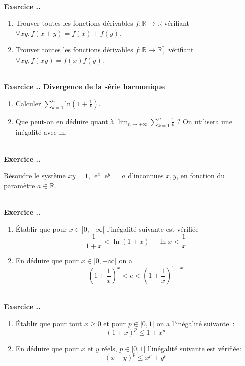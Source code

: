 \documentclass{article}
\newcommand{\ex}{{\operatorname{e}}}
\newcommand{\mb}[1]{\mathbb{#1}}
\newcounter{exo}
\newcommand{\exercice}[1][\null]{\textbf{\\ Exercice \thesection.\theexo. #1} \addtocounter{exo}{1}}
\begin{document}
\exercice

\begin{enumerate}

\item Trouver toutes les fonctions dérivables $f :\mb{R} \rightarrow \mb{R}$ vérifiant $\forall xy, f(x+y) = f(x)+ f(y)$.

\item Trouver toutes les fonctions dérivables $f :\mb{R} \rightarrow \mb{R}^*_+$ vérifiant $\forall xy, f(xy) = f(x)f(y)$.
\end{enumerate}



\exercice[Divergence de la série harmonique]

\begin{enumerate}

\item Calculer $\displaystyle \sum_{k=1}^n  \text{ln}(1+ \frac{1}{k})$.

\item Que peut-on en déduire quant à $\displaystyle \lim_{n \to + \infty} \sum_{k=1}^n \frac{1}{k}$ ? On utilisera une inégalité avec $\text{ln}$.
\end{enumerate}

\exercice

Résoudre le système $xy = 1$, ${\ex}^x {\ex}^y =a$ d'inconnues $x,y$, en fonction du paramètre $a \in \mb{R}$.


\exercice 

\begin{enumerate}
    \item Établir que pour $x \in ]0, +\infty[$ l'inégalité suivante
        est vérifiée
        \begin{equation*}
            \frac{1}{1+x} < \ln (1 + x) - \ln x < \frac{1}{x}
        \end{equation*}

    \item En déduire que pour $x \in ]0,+\infty[$ on a
        \begin{equation*}
            \left(1 + \frac{1}{x}\right)^x < e < \left(1 + \frac{1}{x}\right)^{1 + x}
        \end{equation*}
\end{enumerate}

\exercice 

\begin{enumerate}
    \item Établir que pour tout $x \geq 0$ et pour $p \in ]0,1[$ on a 
        l'inégalité suivante~:
        \begin{equation*}
            (1 + x)^p \leq 1 + x^p
        \end{equation*}

    \item En déduire que pour $x$ et $y$ réels, $p \in ]0,1[$
        l'inégalité suivante est vérifiée:
        \begin{equation*}
            (x + y)^p \leq x^p + y^p
        \end{equation*}
\end{enumerate}
\end{document}
